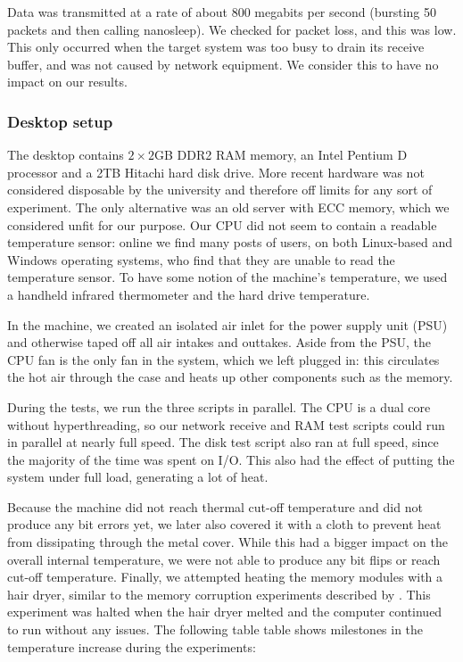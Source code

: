 \documentclass[conference]{IEEEtran}
\begin{document}
Data was transmitted at a rate of about 800 megabits per second (bursting 50
packets and then calling nanosleep). We checked for packet loss, and this was
low. This only occurred when the target system was too busy to drain its
receive buffer, and was not caused by network equipment. We consider this to
have no impact on our results.

\subsubsection{Desktop setup}

The desktop contains $2\times2$GB DDR2 RAM memory, an Intel Pentium D processor
and a 2TB Hitachi hard disk drive. More recent hardware was not considered
disposable by the university and therefore off limits for any sort of
experiment. The only alternative was an old server with ECC memory, which we
considered unfit for our purpose. Our CPU did not seem to contain a readable
temperature sensor: online we find many posts of users, on both Linux-based and
Windows operating systems, who find that they are unable to read the
temperature sensor. To have some notion of the machine's temperature, we used a
handheld infrared thermometer and the hard drive temperature.

In the machine, we created an isolated air inlet for the power supply unit
(PSU) and otherwise taped off all air intakes and outtakes. Aside from the PSU,
the CPU fan is the only fan in the system, which we left plugged in: this
circulates the hot air through the case and heats up other components such as
the memory.

During the tests, we run the three scripts in parallel. The CPU is a dual core
without hyperthreading, so our network receive and RAM test scripts could run
in parallel at nearly full speed. The disk test script also ran at full speed,
since the majority of the time was spent on I/O. This also had the effect of
putting the system under full load, generating a lot of heat.

Because the machine did not reach thermal cut-off temperature and did not
produce any bit errors yet, we later also covered it with a cloth to prevent
heat from dissipating through the metal cover. While this had a bigger impact
on the overall internal temperature, we were not able to produce any bit flips
or reach cut-off temperature. Finally, we attempted heating the memory modules
with a hair dryer, similar to the memory corruption experiments described by
\cite{jvm}. This experiment was halted when the hair dryer melted and the
computer continued to run without any issues. The following table table shows
milestones in the temperature increase during the experiments:
\end{document}
